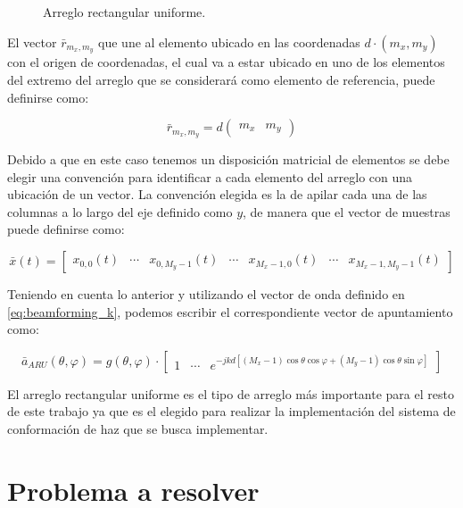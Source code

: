 \begin{figure}
\begin{subfigure}[b]{0.7\textwidth}
    \end{subfigure}
    \caption{Arreglo rectangular uniforme.}
    \label{fig:beamforming_ura}
\end{figure}

El vector $\bar{r}_{m_x,m_y}$ que une al elemento ubicado en las coordenadas $d\cdot(m_x,m_y)$ con el origen de coordenadas, el cual va a estar ubicado en uno de los elementos del extremo del arreglo que se considerará como elemento de referencia, puede definirse como:

\begin{equation}
    \bar{r}_{m_x,m_y} = d \begin{pmatrix}
        m_x & m_y
    \end{pmatrix}
\end{equation}

Debido a que en este caso tenemos un disposición matricial de elementos se debe elegir una convención para identificar a cada elemento del arreglo con una ubicación de un vector. La convención elegida es la de apilar cada una de las columnas a lo largo del eje definido como $y$, de manera que el vector de muestras puede definirse como:

\begin{equation}
    \bar{x}(t)= \begin{bmatrix}
        x_{0,0}(t) & \cdots & x_{0,M_y-1}(t) & \cdots & x_{M_x-1,0}(t) & \cdots & x_{M_x-1,M_y-1}(t)
    \end{bmatrix}
\end{equation}

Teniendo en cuenta lo anterior y utilizando el vector de onda definido en \ref{eq:beamforming_k}, podemos escribir el correspondiente vector de apuntamiento como:

\begin{equation}
    \bar{a}_{ARU}(\theta,\varphi) = g(\theta,\varphi) \cdot \begin{bmatrix}
        1 & \cdots & e^{-jkd[(M_x-1)\cos\theta\cos\varphi+(M_y-1)\cos\theta\sin\varphi]}
    \end{bmatrix}
\end{equation}

El arreglo rectangular uniforme es el tipo de arreglo más importante para el resto de este trabajo ya que es el elegido para realizar la implementación del sistema de conformación de haz que se busca implementar.

\section{Problema a resolver}\label{subc:beamforming_problem}

